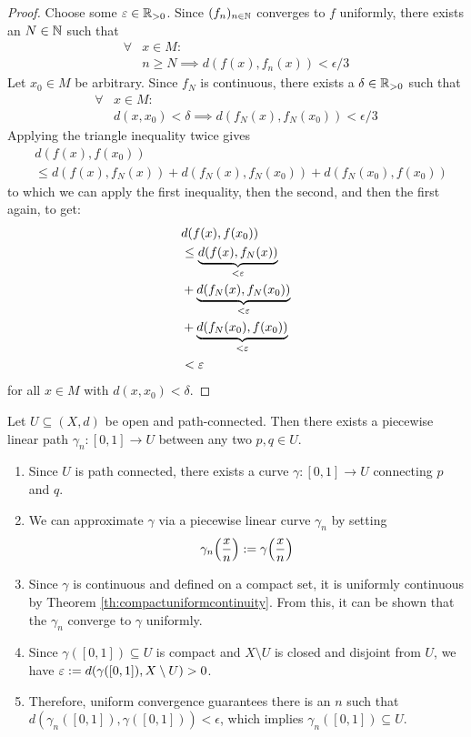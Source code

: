 \begin{proof}
	Choose some $\varepsilon \in \mathbb{R}_{> 0}$. Since $(f_n)_{n \in \mathbb{N}}$ converges to $f$ uniformly, there exists an $N \in \mathbb{N}$ such that
	\begin{align*}
		\forall &x \in M :\\
		&n \geq N \implies d(f(x), f_n(x)) < \epsilon/3
	\end{align*}
	Let $x_0 \in M$ be arbitrary.
	Since $f_N$ is continuous, there exists a $\delta \in \mathbb{R}_{> 0}$ such that
	\begin{align*}
		\forall &x \in M :\\
		&d(x, x_0) < \delta \implies d(f_N(x), f_N(x_0)) < \epsilon/3
	\end{align*}
	Applying the triangle inequality twice gives
	\begin{align*}
		&d(f(x), f(x_0))\\ &\leq d(f(x), f_N(x)) + d(f_N(x), f_N(x_0)) + d(f_N(x_0), f(x_0))
	\end{align*}
	to which we can apply the first inequality, then the second, and then the first again, to get:
	\begin{align*}
		&d(f(x), f(x_0))\\
		&\leq \underbrace{d(f(x), f_N(x))}_{< \varepsilon}  \\
		&+ \underbrace{d(f_N(x), f_N(x_0))}_{< \varepsilon}\\
		&+ \underbrace{d(f_N(x_0), f(x_0))}_{< \varepsilon}\\
		&< \varepsilon
	\end{align*}
	for all $x \in M$ with $d(x, x_0) < \delta$.
\end{proof}
\begin{theorem}
	Let $U \subseteq (X,d)$ be open and path-connected. Then there exists a piecewise linear path $\gamma_n : [0,1] \to U$ between any two $p,q \in U$.
\end{theorem}
\begin{proofsketch}
	\begin{enumerate}
		\item Since $U$ is path connected, there exists a curve $\gamma : [0,1] \to U$ connecting $p$ and $q$.
		\item We can approximate $\gamma$ via a piecewise linear curve $\gamma_n$ by setting
		\begin{align*}
			\gamma_n\qty(\frac{x}{n}) := \gamma\qty(\frac{x}{n})
		\end{align*}
		\item Since $\gamma$ is continuous and defined on a compact set, it is uniformly continuous by Theorem \ref{th:compactuniformcontinuity}. From this, it can be shown that the $\gamma_n$ converge to $\gamma$ uniformly.
		\item Since $\gamma([0,1]) \subseteq U$ is compact and $X \setminus U$ is closed and disjoint from $U$, we have $\varepsilon := d\qty(\gamma([0,1]), X \setminus U) > 0$.
		\item Therefore, uniform convergence guarantees there is an $n$ such that $d(\gamma_n([0,1]), \gamma([0,1])) < \epsilon$, which implies $\gamma_n([0,1]) \subseteq U$.
	\end{enumerate}
\end{proofsketch}
\clearpage
